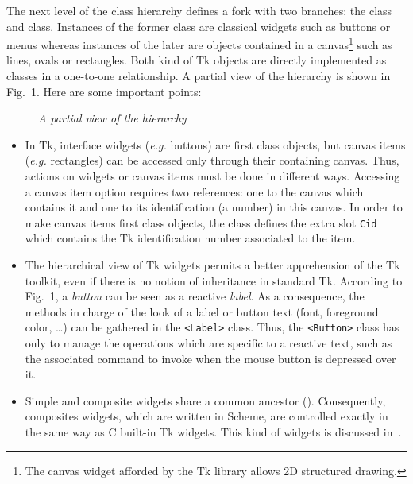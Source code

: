{The next level of the class hierarchy defines a fork with two
branches: the {\tt <Tk-widget>} class and {\tt <Tk-canvas-item>}
class. Instances of the former class are classical widgets such as
buttons or menus whereas instances of the later are objects contained
in a canvas\footnote{The canvas widget afforded by the Tk library
allows 2D structured drawing.} such as lines, ovals or
rectangles. Both kind of Tk objects are directly implemented as
{\stklos} classes in a one-to-one relationship. A partial view of the
{\stklos} hierarchy is shown in Fig.~1. Here are some important
points:
\begin{figure}
\centerline{}
\caption[]{\em A partial view of the {\stklos} hierarchy}
\end{figure}
\begin{itemize}
		\item In Tk, interface widgets ({\em e.g.} buttons) are
first class objects, but canvas items ({\em e.g.} rectangles) can be
accessed only through their containing canvas. Thus, actions on widgets or
canvas items must be done in different ways.  Accessing a canvas item
option requires two references: one to the canvas which contains it and one
to its identification (a number) in this canvas. In order to make canvas
items first class objects, the class {\tt <Tk-canvas-item>} defines the
extra slot {\tt Cid} which contains the Tk identification number associated
to the item.

		\item The hierarchical view of Tk widgets permits a better
apprehension of the Tk toolkit, even if there is no notion of inheritance
in standard Tk. According to Fig.~1, a {\em button} can be seen as a
reactive {\em label}. As a consequence, the methods in charge of the look
of a label or button text (font, foreground color, \ldots) can be gathered
in the {\tt <Label>} class. Thus, the {\tt <Button>} class has only to
manage the operations which are specific to a reactive text, such as the
associated command to invoke when the mouse button is depressed over it.

		\item Simple and composite widgets share a common
ancestor ({\tt <Tk-widget>}). Consequently, composites widgets, which
are written in Scheme, are controlled exactly in the same way as C
built-in Tk widgets. This kind of widgets is discussed in~\cite{Gallesio94-1}.
\end{itemize}

}
